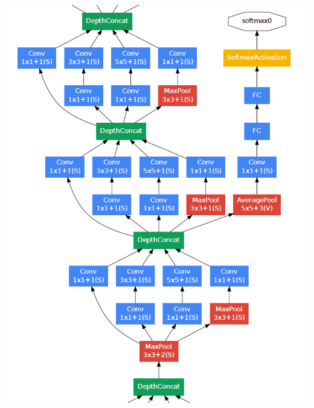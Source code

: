 \begin{frame}[allowframebreaks]
\begin{columns}
		\begin{column}{.4\textwidth}
			\begin{center}
				\includegraphics[scale=0.5]{figs/GoogleNet_scheme_1}
			\end{center}
		\end{column}
		
		
	

\end{columns}
\end{frame}
